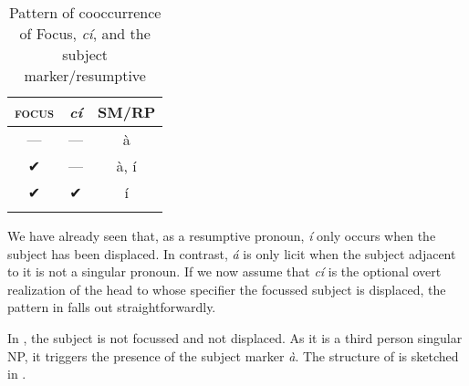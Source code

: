 \documentclass[output=paper]{langscibook}
\begin{document}
\begin{table}
    \caption{Pattern of cooccurrence of Focus, \textit{cí}, and the subject marker/resumptive\label{tab:johanneshein:focusdistro}}
\begin{tabular}{ccc}
  \lsptoprule
  \textsc{focus}&\textit{cí}&SM/RP\\
  \midrule
  ---&---&à\hphantom{, í}\\
  ✔&---&à, í\\
  ✔&✔&\hphantom{à, }í\\
  \lspbottomrule
\end{tabular}
\end{table}

We have already seen that, as a resumptive pronoun, \textit{í} only
occurs when the subject has been displaced. In contrast,
\textit{á} is only licit when the subject adjacent to it is not a
singular pronoun. If we now assume that \textit{cí} is the optional
overt realization of the head to whose specifier the focussed subject
is displaced, the pattern in  falls out straightforwardly.

In , the subject is not focussed and not displaced. As it is a
third person singular NP, it triggers the presence of the subject
marker \textit{à}. The structure of  is sketched in .
\end{document}
